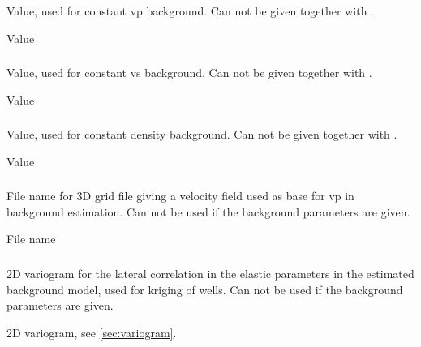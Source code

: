 \subsubsection{}
 \slist
   \item \Description Value, used for constant vp background. Can not be given together with .
   \item \Argument Value
   \item \Default
 \elist

\subsubsection{}
 \slist
   \item \Description Value, used for constant vs background. Can not be given together with .
   \item \Argument Value
   \item \Default
 \elist

\subsubsection{}
 \slist
   \item \Description Value, used for constant density background. Can not be given together with .
   \item \Argument Value
   \item \Default
 \elist

\subsubsection{}
 \slist
   \item \Description File name for 3D grid file giving a velocity field used as base for vp in background estimation. Can not be used if the background parameters are given.
   \item \Argument File name
   \item \Default
 \elist

\subsubsection{}
 \slist
   \item \Description 2D variogram for the lateral correlation in the elastic parameters in the estimated background model, used for kriging of wells. Can not be used if the background parameters are given.
   \item \Argument 2D variogram, see \autoref{sec:variogram}.
   \item \Default
 \elist

